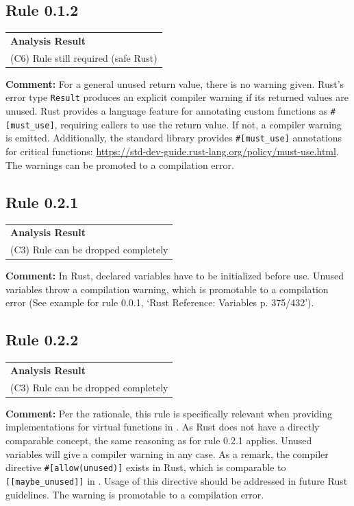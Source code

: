 \subsection*{Rule 0.1.2}
\begin{longtable}{p{13cm}}
\textbf{Analysis Result} \\
(C6) Rule still required (safe Rust) \\
\end{longtable}
\textbf{Comment:} For a general unused return value, there is no warning given. Rust's error type \texttt{Result} produces an explicit compiler warning if its returned values are unused. Rust provides a language feature for annotating custom functions as \texttt{\#[must\_use]}, requiring callers to use the return value. If not, a compiler warning is emitted. Additionally, the standard library provides \texttt{\#[must\_use]} annotations for critical functions: \url{https://std-dev-guide.rust-lang.org/policy/must-use.html}. The warnings can be promoted to a compilation error. \\


\subsection*{Rule 0.2.1}
\begin{longtable}{p{13cm}}
\textbf{Analysis Result} \\
(C3) Rule can be dropped completely \\
\end{longtable}
\textbf{Comment:}  In Rust, declared variables have to be initialized before use. Unused variables throw a compilation warning, which is promotable to a compilation error (See example for rule 0.0.1, `Rust Reference: Variables p. 375/432'). \\
\subsection*{Rule 0.2.2}
\begin{longtable}{p{13cm}}
\textbf{Analysis Result} \\
(C3) Rule can be dropped completely \\
\end{longtable}
\textbf{Comment:} Per the rationale, this rule is specifically relevant when providing implementations for virtual functions in \Cpp. As Rust does not have a directly comparable concept, the same reasoning as for rule 0.2.1 applies. Unused variables will give a compiler warning in any case. As a remark, the compiler directive \texttt{\#[allow(unused)]} exists in Rust, which is comparable to \texttt{[[maybe\_unused]]} in \Cpp. Usage of this directive should be addressed in future Rust guidelines. The warning is promotable to a compilation error. \\
